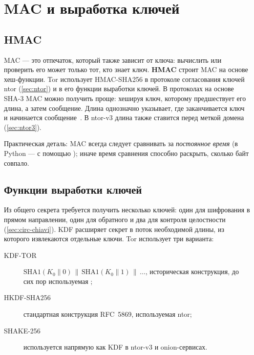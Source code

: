 \section{MAC и выработка ключей}\label{sec:cripto-mac}

\subsection{HMAC}

MAC --- это отпечаток, который также зависит от ключа: вычислить или проверить его может только тот, кто знает ключ. \textbf{HMAC} строит MAC на основе хеш-функции. Tor использует HMAC-SHA256 в протоколе согласования ключей ntor (\cref{sec:ntor}) и в его функции выработки ключей. В протоколах на основе SHA-3 MAC можно получить проще: хешируя ключ, которому предшествует его длина, а затем сообщение. Длина однозначно указывает, где заканчивается ключ и начинается сообщение~. В ntor-v3 длина также ставится перед меткой домена (\cref{sec:ntor3}).

Практическая деталь: MAC всегда следует сравнивать за \emph{постоянное время} (в Python --- с помощью ); иначе время сравнения способно раскрыть, сколько байт совпало.

\subsection{Функции выработки ключей}

Из общего секрета требуется получить несколько ключей: один для шифрования в прямом направлении, один для обратного и два для контроля целостности (\cref{sec:circ-chiavi}). KDF расширяет секрет в поток необходимой длины, из которого извлекаются отдельные ключи. Tor использует три варианта:
\begin{description}
  \item[KDF-TOR] $\mathrm{SHA1}(K_0 \| 0) \,\|\, \mathrm{SHA1}(K_0 \| 1) \,\|\, \ldots$, историческая конструкция, до сих пор используемая ;
  \item[HKDF-SHA256] стандартная конструкция RFC~5869, используемая ntor;
  \item[SHAKE-256] используется напрямую как KDF в ntor-v3 и onion-сервисах.
\end{description}

